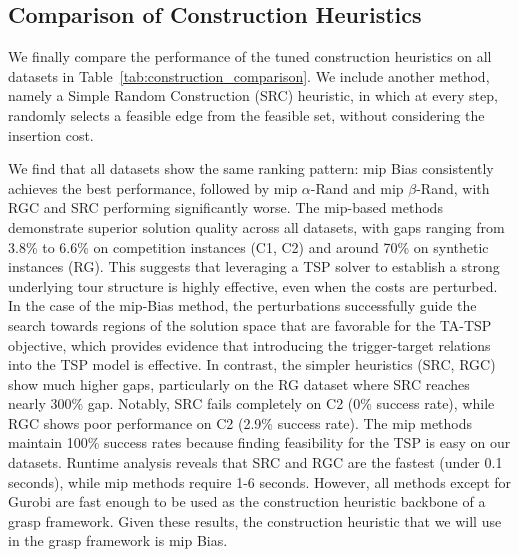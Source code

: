 \documentclass[twocolumn, switch]{article} %
\begin{document}
\subsection{Comparison of Construction Heuristics}

We finally compare the performance of the tuned construction heuristics on all datasets in Table~\ref{tab:construction_comparison}.
We include another method, namely a Simple Random Construction (SRC) heuristic, in which at every step, randomly selects a feasible edge from the feasible set, without considering the insertion cost.

We find that all datasets show the same ranking pattern: \gls{mip} Bias consistently achieves the best performance, followed by \gls{mip} $\alpha$-Rand and \gls{mip} $\beta$-Rand, with RGC and SRC performing significantly worse.
The \gls{mip}-based methods demonstrate superior solution quality across all datasets, with gaps ranging from 3.8\% to 6.6\% on competition instances (C1, C2) and around 70\% on synthetic instances (RG).
This suggests that leveraging a TSP solver to establish a strong underlying tour structure is highly effective, even when the costs are perturbed.
In the case of the \gls{mip}-Bias method, the perturbations successfully guide the search towards regions of the solution space that are favorable for the TA-TSP objective, which provides evidence that introducing the trigger-target relations into the TSP model is effective.
In contrast, the simpler heuristics (SRC, RGC) show much higher gaps, particularly on the RG dataset where SRC reaches nearly 300\% gap. Notably, SRC fails completely on C2 (0\% success rate), while RGC shows poor performance on C2 (2.9\% success rate).
The \gls{mip} methods maintain 100\% success rates because finding feasibility for the TSP is easy on our datasets.
Runtime analysis reveals that SRC and RGC are the fastest (under 0.1 seconds), while \gls{mip} methods require 1-6 seconds.
However, all methods except for Gurobi are fast enough to be used as the construction heuristic backbone of a \gls{grasp} framework.
Given these results, the construction heuristic that we will use in the \gls{grasp} framework is \gls{mip} Bias.
\end{document}
